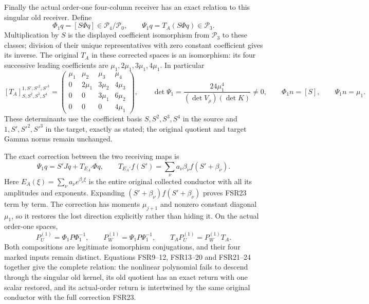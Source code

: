 Finally the actual order-one four-column receiver has an exact
relation to this singular old receiver. Define
\[
 \Phi_1q=[S\Phi q]\in\mathcal P_4/\mathcal P_0,
 \qquad \Psi_1q=T_A(S\Phi q)\in\mathcal P_3.
 \tag{FSR21}
\]
Multiplication by $S$ is the displayed coefficient isomorphism
from $\mathcal P_3$ to these classes; division of their unique
representatives with zero constant coefficient gives its inverse.
The original $T_A$ in these corrected spaces is an isomorphism:
its four successive leading coefficients are
$\mu_1,2\mu_1,3\mu_1,4\mu_1$. In particular
\[
 [T_A]_{S,S^2,S^3,S^4}^{1,S',S'^2,S'^3}=
 \begin{pmatrix}
 \mu_1&\mu_2&\mu_3&\mu_4\\
 0&2\mu_1&3\mu_2&4\mu_3\\
 0&0&3\mu_1&6\mu_2\\
 0&0&0&4\mu_1
 \end{pmatrix},\qquad
 \det\Psi_1=\frac{24\mu_1^4}{(\det V_\rho)(\det K)}\ne0,
 \qquad \Phi_1n=[S],\qquad \Psi_1n=\mu_1.
 \tag{FSR22}
\]
These determinants use the coefficient basis $S,S^2,S^3,S^4$
in the source and $1,S',S'^2,S'^3$ in the target, exactly as stated;
the original quotient and target Gamma norms remain unchanged.

The exact correction between the two receiving maps is
\[
 \Psi_1q=S'Jq+T_{E_A'}\Phi q,\qquad
 T_{E_A'}f(S')=\sum_\nu a_\nu\beta_\nu f(S'+\beta_\nu).
 \tag{FSR23}
\]
Here $E_A(\xi)=\sum_\nu a_\nu e^{\beta_\nu\xi}$ is the entire
original collected conductor with all its amplitudes and exponents.
Expanding $(S'+\beta_\nu)f(S'+\beta_\nu)$ proves FSR23 term
by term. The correction has moments $\mu_{j+1}$ and nonzero
constant diagonal $\mu_1$, so it restores the lost direction
explicitly rather than hiding it. On the actual order-one spaces,
\[
 P_U^{(1)}=\Phi_1P\Phi_1^{-1},\qquad
 P_W^{(1)}=\Psi_1P\Psi_1^{-1},\qquad
 T_AP_U^{(1)}=P_W^{(1)}T_A.
 \tag{FSR24}
\]
Both compositions are legitimate isomorphism conjugations, and
their four marked inputs remain distinct. Equations FSR9--12,
FSR13--20 and FSR21--24 together give the complete relation:
the nonlinear polynomial fails to descend through the singular
old kernel, its old quotient has an exact return with one scalar
restored, and its actual-order return is intertwined by the same
original conductor with the full correction FSR23.

